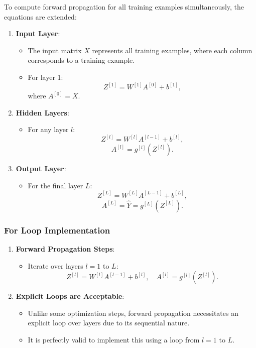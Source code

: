 \documentclass[letterpaper,12pt,notitlepage,twoside]{report}
\begin{document}
To compute forward propagation for all training examples simultaneously, the equations are extended:

\begin{enumerate}
    \item \textbf{Input Layer}:
    \begin{itemize}
        \item The input matrix \( X \) represents all training examples, where each column corresponds to a training example.
        \item For layer 1:
        \[
        Z^{[1]} = W^{[1]} A^{[0]} + b^{[1]},
        \]
        where \( A^{[0]} = X \).
    \end{itemize}
    
    \item \textbf{Hidden Layers}:
    \begin{itemize}
        \item For any layer \( l \):
        \[
        Z^{[l]} = W^{[l]} A^{[l-1]} + b^{[l]},
        \]
        \[
        A^{[l]} = g^{[l]}(Z^{[l]}).
        \]
    \end{itemize}
    
    \item \textbf{Output Layer}:
    \begin{itemize}
        \item For the final layer \( L \):
        \[
        Z^{[L]} = W^{[L]} A^{[L-1]} + b^{[L]},
        \]
        \[
        A^{[L]} = \hat{Y} = g^{[L]}(Z^{[L]}).
        \]
    \end{itemize}
\end{enumerate}

\subsubsection{For Loop Implementation}

\begin{enumerate}
    \item \textbf{Forward Propagation Steps}:
    \begin{itemize}
        \item Iterate over layers \( l = 1 \) to \( L \):
        \[
        Z^{[l]} = W^{[l]} A^{[l-1]} + b^{[l]}, \quad A^{[l]} = g^{[l]}(Z^{[l]}).
        \]
    \end{itemize}
    
    \item \textbf{Explicit Loops are Acceptable}:
    \begin{itemize}
        \item Unlike some optimization steps, forward propagation necessitates an explicit loop over layers due to its sequential nature.
        \item It is perfectly valid to implement this using a loop from \( l = 1 \) to \( L \).
    \end{itemize}
\end{enumerate}
\end{document}
